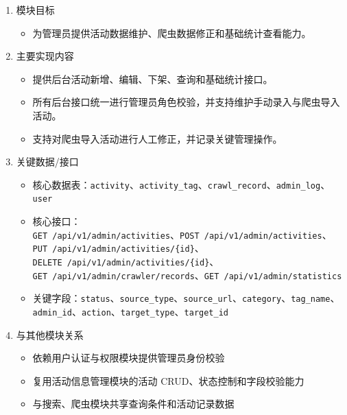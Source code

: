 \documentclass[UTF8,a4paper,12pt,fontset=none]{ctexrep}
\providecommand{\tightlist}{}
\begin{document}
\begin{enumerate}
\def\labelenumi{\arabic{enumi}.}
\item
  模块目标

  \begin{itemize}
  \tightlist
  \item
    为管理员提供活动数据维护、爬虫数据修正和基础统计查看能力。
  \end{itemize}
\item
  主要实现内容

  \begin{itemize}
  \tightlist
  \item
    提供后台活动新增、编辑、下架、查询和基础统计接口。
  \item
    所有后台接口统一进行管理员角色校验，并支持维护手动录入与爬虫导入活动。
  \item
    支持对爬虫导入活动进行人工修正，并记录关键管理操作。
  \end{itemize}
\item
  关键数据/接口

  \begin{itemize}
  \tightlist
  \item
    核心数据表：\texttt{activity}、\texttt{activity\_tag}、\texttt{crawl\_record}、\texttt{admin\_log}、\texttt{user}
  \item
    核心接口：\\
    \texttt{GET\ /api/v1/admin/activities}、\texttt{POST\ /api/v1/admin/activities}、\\
    \texttt{PUT\ /api/v1/admin/activities/\{id\}}、\\
    \texttt{DELETE\ /api/v1/admin/activities/\{id\}}、\\
    \texttt{GET\ /api/v1/admin/crawler/records}、\texttt{GET\ /api/v1/admin/statistics}
  \item
    关键字段：\texttt{status}、\texttt{source\_type}、\texttt{source\_url}、\texttt{category}、\texttt{tag\_name}、\texttt{admin\_id}、\texttt{action}、\texttt{target\_type}、\texttt{target\_id}
  \end{itemize}
\item
  与其他模块关系

  \begin{itemize}
  \tightlist
  \item
    依赖用户认证与权限模块提供管理员身份校验
  \item
    复用活动信息管理模块的活动 CRUD、状态控制和字段校验能力
  \item
    与搜索、爬虫模块共享查询条件和活动记录数据
  \end{itemize}
\end{enumerate}
\end{document}
